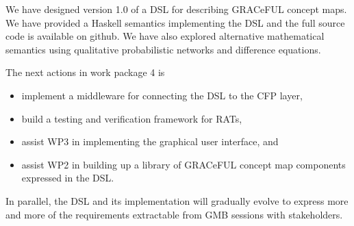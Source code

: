 \documentclass[]{article}
\begin{document}
We have designed version 1.0 of a DSL for describing GRACeFUL concept
maps.
%
We have provided a Haskell semantics implementing the DSL and the full
source code is available on github.
%
We have also explored alternative mathematical semantics using
qualitative probabilistic networks and difference equations.

The next actions in work package 4 is
\begin{itemize}
\item implement a middleware for connecting the DSL to the CFP layer,
\item build a testing and verification framework for RATs,
\item assist WP3 in implementing the graphical user interface, and
\item assist WP2 in building up a library of GRACeFUL concept map
  components expressed in the DSL.
\end{itemize}
%
In parallel, the DSL and its implementation will gradually evolve to
express more and more of the requirements extractable from GMB
sessions with stakeholders.





\end{document}
